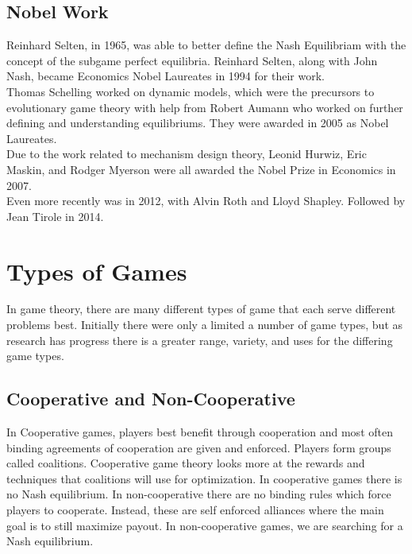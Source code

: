 \documentclass[12pt]{article}
\begin{document}
 	 \subsection{Nobel Work}
 	 Reinhard Selten, in 1965, was able to better define the Nash Equilibriam with the concept of the subgame perfect equilibria. Reinhard Selten, along with John Nash, became Economics Nobel Laureates in 1994 for their work.\\
 	 Thomas Schelling worked on dynamic models, which were the precursors to evolutionary game theory with help from Robert Aumann who worked on further defining and understanding equilibriums. They were awarded in 2005 as Nobel Laureates.\\
 	 Due to the work related to mechanism design theory, Leonid Hurwiz, Eric Maskin, and Rodger Myerson were all awarded the Nobel Prize in Economics in 2007.\\
 	 Even more recently was in 2012, with Alvin Roth and Lloyd Shapley. Followed by Jean Tirole in 2014.
 	\section{Types of Games}
 	In game theory, there are many different types of game that each serve different problems best. Initially there were only a limited a number of game types, but as research has progress there is a greater range, variety, and uses for the differing game types.
 	\subsection{Cooperative and Non-Cooperative}
 		In Cooperative games, players best benefit through cooperation and most often binding agreements of cooperation are given and enforced. Players form groups called coalitions. Cooperative game theory looks more at the rewards and techniques that coalitions will use for optimization. In cooperative games there is no Nash equilibrium. In non-cooperative there are no binding rules which force players to cooperate. Instead, these are self enforced alliances where the main goal is to still maximize payout. In non-cooperative games, we are searching for a Nash equilibrium.
\end{document}
